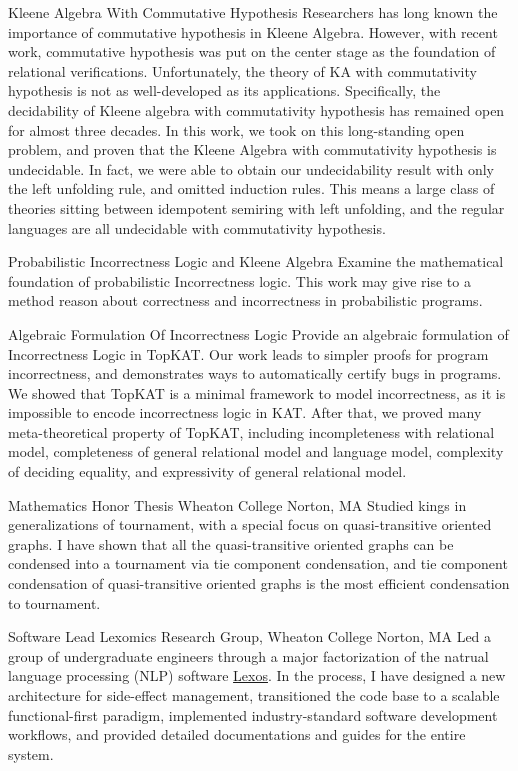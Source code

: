 \documentclass[11pt,roman]{moderncv}        %
\begin{document}
{Kleene Algebra With Commutative Hypothesis}
{}{}{}
{Researchers has long known the importance of commutative hypothesis in Kleene Algebra.
However, with recent work, commutative hypothesis was put on the center stage as the foundation of relational verifications. 
Unfortunately, the theory of KA with commutativity hypothesis is not as well-developed as its applications. 
Specifically, the decidability of Kleene algebra with commutativity hypothesis has remained open for almost three decades.
In this work, we took on this long-standing open problem, and proven that the Kleene Algebra with commutativity hypothesis is undecidable.
In fact, we were able to obtain our undecidability result with only the left unfolding rule, and omitted induction rules. This means a large class of theories sitting between idempotent semiring with left unfolding, and the regular languages are all undecidable with commutativity hypothesis.}

{Probabilistic Incorrectness Logic and Kleene Algebra}
{}{}{}
{Examine the mathematical foundation of probabilistic Incorrectness logic.
This work may give rise to a method reason about correctness and incorrectness in probabilistic programs.}

{Algebraic Formulation Of Incorrectness Logic}
{}{}{}
{Provide an algebraic formulation of Incorrectness Logic in TopKAT.
Our work leads to simpler proofs for program incorrectness, 
and demonstrates ways to automatically certify bugs in programs.
We showed that TopKAT is a minimal framework to model incorrectness,
as it is impossible to encode incorrectness logic in KAT.
After that, we proved many meta-theoretical property of TopKAT,
including incompleteness with relational model, 
completeness of general relational model and language model, 
complexity of deciding equality, and expressivity of general relational model.
}

{Mathematics Honor Thesis}
{Wheaton College} {Norton, MA}{}
{Studied kings in generalizations of tournament,
with a special focus on quasi-transitive oriented graphs.
I have shown that all the quasi-transitive oriented graphs
can be condensed into a tournament via tie component condensation, 
and tie component condensation of quasi-transitive 
oriented graphs is the most efficient condensation to tournament.
}

{Software Lead}
{Lexomics Research Group, Wheaton College}
{Norton, MA}{}
{
  Led a group of undergraduate engineers through a major factorization of 
  the natrual language processing (NLP) software 
  \href{https://github.com/WheatonCS/Lexos}{Lexos}.
  In the process, 
  I have designed a new architecture for side-effect management,
  transitioned the code base to a scalable functional-first paradigm,
  implemented industry-standard software development workflows,
  and provided detailed documentations and guides for the entire system.
}
\end{document}

